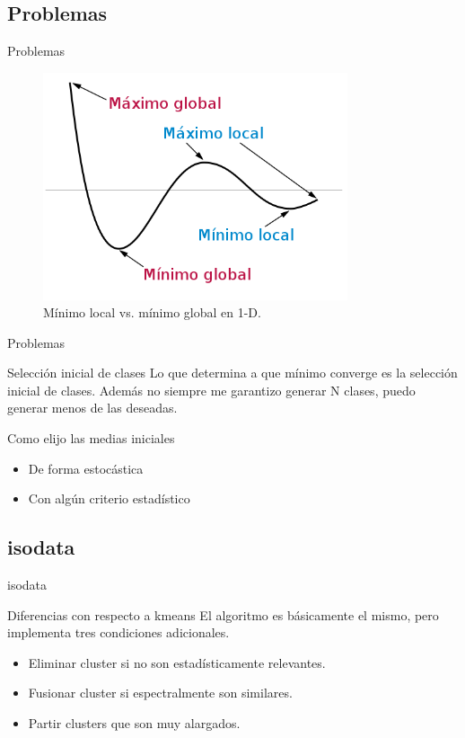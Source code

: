 \documentclass[]{beamer}
\begin{document}
\subsection{Problemas}

\begin{frame}{Problemas}
  \begin{figure}
    \includegraphics[width=0.8\textwidth]{imagenes/minimo.png}
    \caption{Mínimo local vs. mínimo global en 1-D.}
  \end{figure}
\end{frame}

\begin{frame}{Problemas}
  \begin{alertblock}{Selección inicial de clases}
    Lo que determina a que mínimo converge es la selección inicial de clases. Además no siempre me garantizo generar N clases, puedo generar menos de las deseadas.
  \end{alertblock}\pause
  \begin{block}{Como elijo las medias iniciales}
    \begin{itemize}[<+>]
      \item De forma estocástica
      \item Con algún criterio estadístico
    \end{itemize}
  \end{block}
\end{frame}

\subsection{isodata}

\begin{frame}{isodata}
  \begin{block}{Diferencias con respecto a kmeans}
    El algoritmo es básicamente el mismo, pero implementa tres condiciones adicionales.
    \begin{itemize}[<+>]
      \item Eliminar cluster si no son estadísticamente relevantes.
      \item Fusionar cluster si espectralmente son similares.
      \item Partir clusters que son muy alargados.
    \end{itemize}
  \end{block}
\end{frame}
\end{document}

